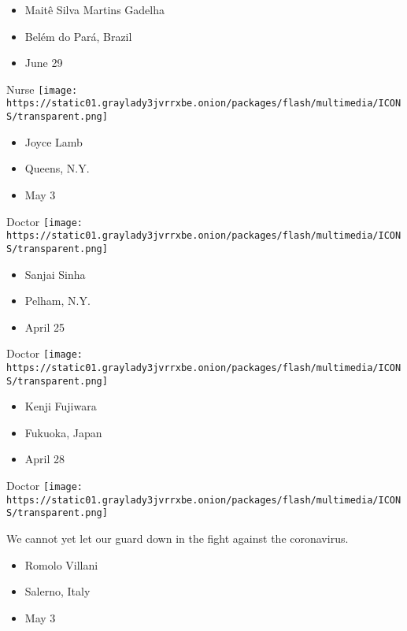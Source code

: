 \begin{itemize}
\tightlist
\item
  Maitê Silva Martins Gadelha
\item
  Belém do Pará, Brazil
\item
  June 29
\end{itemize}

\protect\hyperlink{item-joyce-lamb}{}

Nurse
\texttt{[image: https://static01.graylady3jvrrxbe.onion/packages/flash/multimedia/ICONS/transparent.png]}

\begin{itemize}
\tightlist
\item
  Joyce Lamb
\item
  Queens, N.Y.
\item
  May 3
\end{itemize}

\protect\hyperlink{item-sanjai-sinha}{}

Doctor
\texttt{[image: https://static01.graylady3jvrrxbe.onion/packages/flash/multimedia/ICONS/transparent.png]}

\begin{itemize}
\tightlist
\item
  Sanjai Sinha
\item
  Pelham, N.Y.
\item
  April 25
\end{itemize}

\protect\hyperlink{item-kenji-fujiwara}{}

Doctor
\texttt{[image: https://static01.graylady3jvrrxbe.onion/packages/flash/multimedia/ICONS/transparent.png]}

\begin{itemize}
\tightlist
\item
  Kenji Fujiwara
\item
  Fukuoka, Japan
\item
  April 28
\end{itemize}

\protect\hyperlink{item-romolo-villani}{}

Doctor
\texttt{[image: https://static01.graylady3jvrrxbe.onion/packages/flash/multimedia/ICONS/transparent.png]}

We cannot yet let our guard down in the fight against the coronavirus.

\begin{itemize}
\tightlist
\item
  Romolo Villani
\item
  Salerno, Italy
\item
  May 3
\end{itemize}

